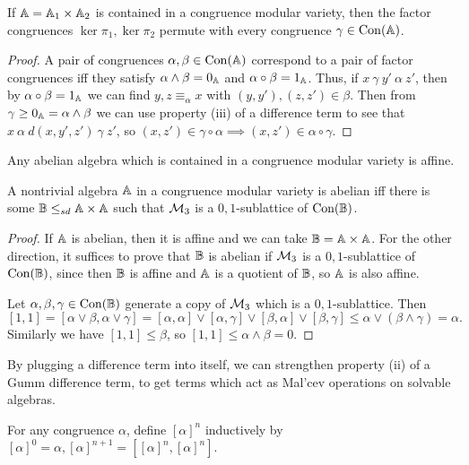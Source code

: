 \begin{appendices}
\begin{cor} If $\mathbb{A} = \mathbb{A}_1\times \mathbb{A}_2$ is contained in a congruence modular variety, then the factor congruences $\ker \pi_1,\ker \pi_2$ permute with every congruence $\gamma \in \operatorname{Con}(\mathbb{A})$.
\end{cor}
\begin{proof} A pair of congruences $\alpha,\beta \in \operatorname{Con}(\mathbb{A})$ correspond to a pair of factor congruences iff they satisfy $\alpha \wedge \beta = 0_{\mathbb{A}}$ and $\alpha \circ \beta = 1_{\mathbb{A}}$. Thus, if $x\ \gamma\ y'\ \alpha\ z'$, then by $\alpha \circ \beta = 1_{\mathbb{A}}$ we can find $y, z \equiv_\alpha x$ with $(y,y'), (z,z') \in \beta$. Then from $\gamma \ge 0_{\mathbb{A}} = \alpha \wedge \beta$ we can use property (iii) of a difference term to see that $x\ \alpha\ d(x,y',z')\ \gamma\ z'$, so $(x,z') \in \gamma \circ \alpha \implies (x,z') \in \alpha \circ \gamma$.
\end{proof}

\begin{cor} Any abelian algebra which is contained in a congruence modular variety is affine.
\end{cor}

\begin{cor} A nontrivial algebra $\mathbb{A}$ in a congruence modular variety is abelian iff there is some $\mathbb{B} \le_{sd} \mathbb{A}\times \mathbb{A}$ such that $\mathcal{M}_3$ is a $0,1$-sublattice of $\operatorname{Con}(\mathbb{B})$.
\end{cor}
\begin{proof} If $\mathbb{A}$ is abelian, then it is affine and we can take $\mathbb{B} = \mathbb{A}\times \mathbb{A}$. For the other direction, it suffices to prove that $\mathbb{B}$ is abelian if $\mathcal{M}_3$ is a $0,1$-sublattice of $\operatorname{Con}(\mathbb{B})$, since then $\mathbb{B}$ is affine and $\mathbb{A}$ is a quotient of $\mathbb{B}$, so $\mathbb{A}$ is also affine.

Let $\alpha, \beta, \gamma \in \operatorname{Con}(\mathbb{B})$ generate a copy of $\mathcal{M}_3$ which is a $0,1$-sublattice. Then
\[
[1,1] = [\alpha \vee \beta, \alpha \vee \gamma] = [\alpha,\alpha]\vee [\alpha,\gamma]\vee [\beta,\alpha]\vee [\beta,\gamma] \le \alpha \vee (\beta \wedge \gamma) = \alpha.
\]
Similarly we have $[1,1] \le \beta$, so $[1,1] \le \alpha \wedge \beta = 0$.
\end{proof}

By plugging a difference term into itself, we can strengthen property (ii) of a Gumm difference term, to get terms which act as Mal'cev operations on solvable algebras.

\begin{defn} For any congruence $\alpha$, define $[\alpha]^n$ inductively by $[\alpha]^0 = \alpha, [\alpha]^{n+1} = [[\alpha]^n,[\alpha]^n]$.
\end{defn}


\end{appendices}

